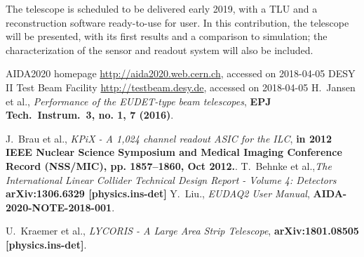 The \lycoris telescope is scheduled to be delivered early 2019, with a TLU and a reconstruction software ready-to-use for user.
In this contribution, the \lycoris telescope will be presented, with its first results and a comparison to simulation;
the characterization of the sensor and readout system will also be included.

\footnotesize
\begin{thebibliography}{1}
 AIDA2020 homepage \url{http://aida2020.web.cern.ch}, accessed on 2018-04-05
 DESY II Test Beam Facility \url{http://testbeam.desy.de}, accessed on 2018-04-05
 H.~Jansen et al., {\em Performance of the EUDET-type beam telescopes},
\textbf{EPJ Tech.\ Instrum.\  {\bf 3}, no. 1, 7 (2016)}.

 J.~Brau et al., {\em KPiX - A 1,024 channel readout ASIC for the ILC},
\textbf{in 2012 IEEE Nuclear Science Symposium and Medical Imaging Conference Record (NSS/MIC), pp. 1857–1860, Oct 2012.}.
  T.~Behnke et al.,{\em The International Linear Collider Technical Design Report - Volume 4: Detectors}
\textbf{  arXiv:1306.6329 [physics.ins-det]}
 Y.~Liu., {\em EUDAQ2 User Manual},
\textbf{AIDA-2020-NOTE-2018-001}.

 U.~Kraemer et al., {\em LYCORIS - A Large Area Strip Telescope},
\textbf{arXiv:1801.08505 [physics.ins-det]}.


\end{thebibliography}


